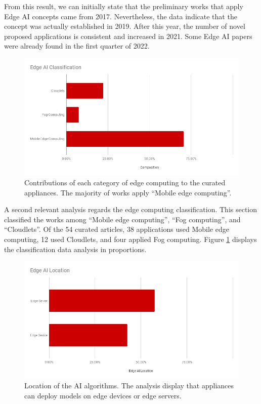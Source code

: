 From this result, we can initially state that the preliminary works that apply Edge AI concepts came from 2017. Nevertheless, the data indicate that the concept was actually established in 2019. After this year, the number of novel proposed applications is consistent and increased in 2021. Some Edge AI papers were already found in the first quarter of 2022.

\begin{figure}[h!]
    \centering
    \includegraphics[width = \linewidth]{Figures/edge-classification.png}
    \caption{Contributions of each category of edge computing to the curated appliances. The majority of works apply ``Mobile edge computing''.}
    \label{fig:edgeclass}
\end{figure}

A second relevant analysis regards the edge computing classification. This section classified the works among ``Mobile edge computing'', ``Fog computing'', and ``Cloudlets''. Of the 54 curated articles, 38 applications used Mobile edge computing, 12 used Cloudlets, and four applied Fog computing. Figure \ref{fig:edgeclass} displays the classification data analysis in proportions.

\begin{figure}[h!]
    \centering
    \includegraphics[width = \linewidth]{Figures/location-ai.png}
    \caption{Location of the AI algorithms. The analysis display that appliances can deploy models on edge devices or edge servers.}
    \label{fig:ailocation}
\end{figure}

